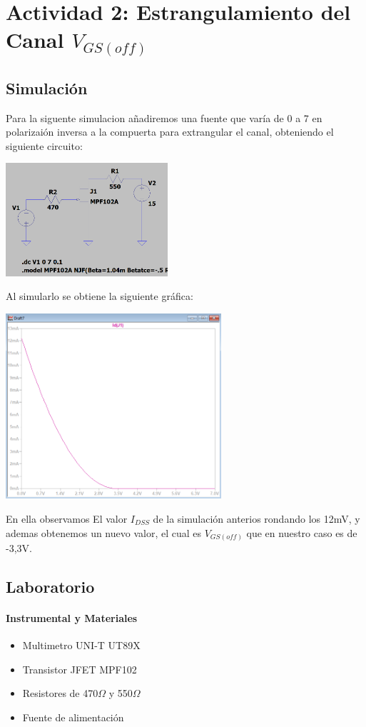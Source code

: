 \newpage

\section{Actividad 2: Estrangulamiento del Canal $V_{GS(off)}$}

\subsection{Simulación}

Para la siguente simulacion añadiremos una fuente que varía de 0 a 7 en polarizaión inversa a la compuerta para extrangular el canal, obteniendo el siguiente circuito:

\includegraphics[width=6cm]{./imagenes/Circ2.png}

Al simularlo se obtiene la siguiente gráfica:

\includegraphics[width=8cm]{./imagenes/Sim2.png}

En ella observamos El valor $I_{DSS}$ de la simulación anterios rondando los 12mV, y ademas obtenemos un nuevo valor, el cual es $V_{GS(off)}$ que en nuestro caso es de -3,3V.

\subsection{Laboratorio}

\paragraph{Instrumental y Materiales}
\begin{itemize}
    \item Multimetro UNI-T UT89X
    \item Transistor JFET MPF102
    \item Resistores de 470$\Omega$ y 550$\Omega$
    \item Fuente de alimentación
\end{itemize}


